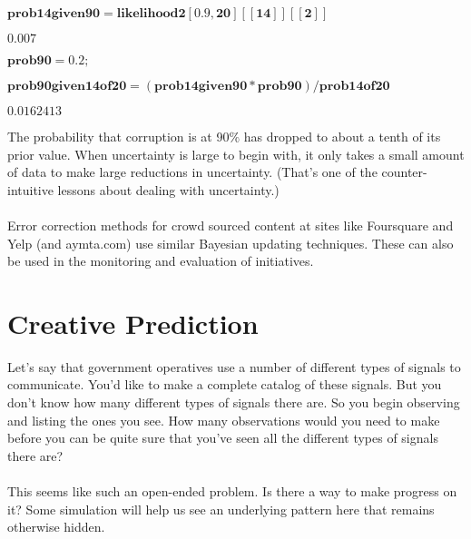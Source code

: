 \documentclass{article}
\begin{document}
\begin{doublespace}
\noindent\(\pmb{\text{prob14given90} = \text{likelihood2}[0.9,20][[14]][[2]]}\)
\end{doublespace}

\begin{doublespace}
\noindent\(0.007\)
\end{doublespace}

\begin{doublespace}
\noindent\(\pmb{\text{prob90} = 0.2;}\)
\end{doublespace}

\begin{doublespace}
\noindent\(\pmb{\text{prob90given14of20} = (\text{prob14given90} * \text{prob90}) / \text{prob14of20}}\)
\end{doublespace}

\begin{doublespace}
\noindent\(0.0162413\)
\end{doublespace}

The probability that corruption is at 90$\%$ has dropped to about a tenth of its prior value. When uncertainty is large to begin with, it only takes
a small amount of data to make large reductions in uncertainty. (That{'}s one of the counter-intuitive lessons about dealing with uncertainty.)\\
\\
Error correction methods for crowd sourced content at sites like Foursquare and Yelp (and aymta.com) use similar Bayesian updating techniques. These
can also be used in the monitoring and evaluation of initiatives.

\section*{Creative Prediction}

Let{'}s say that government operatives use a number of different types of signals to communicate. You{'}d like to make a complete catalog of these
signals. But you don{'}t know how many different types of signals there are. So you begin observing and listing the ones you see. How many observations
would you need to make before you can be quite sure that you{'}ve seen all the different types of signals there are?\\
\\
This seems like such an open-ended problem. Is there a way to make progress on it? Some simulation will help us see an underlying pattern here that
remains otherwise hidden. 
\end{document}
